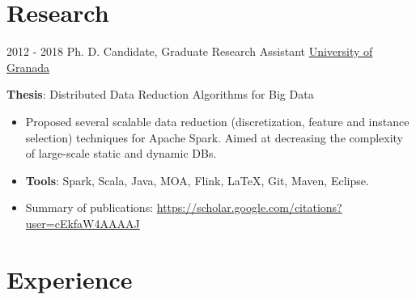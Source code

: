 \documentclass[letterpaper]{twentysecondcv} %
\begin{document}
\section{Research}
\begin{twenty}
	\twentyitem
    	{2012 - 2018}
		{}
        {Ph. D. Candidate, Graduate Research Assistant}
        {\href{http://www.ugr.es/}{University of Granada}}
        {}
        {
       	\textbf{Thesis}: Distributed Data Reduction Algorithms for Big Data
        {\begin{itemize}
        \item Proposed several scalable data reduction (discretization, feature and instance selection) techniques for Apache Spark. Aimed at decreasing the complexity of large-scale static and dynamic DBs.
        \item \textbf{Tools}: Spark, Scala, Java, MOA, Flink, \LaTeX, Git, Maven, Eclipse.
        \item Summary of publications: \url{https://scholar.google.com/citations?user=cEkfaW4AAAAJ}
		\end{itemize}}
        }
\end{twenty}


\section{Experience}
\end{document}
